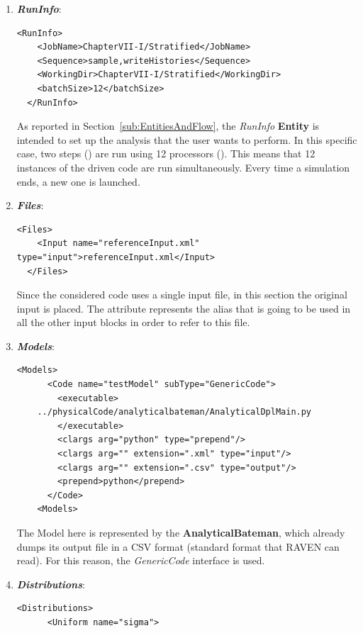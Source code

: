 \begin{enumerate}
   \item \textbf{\textit{RunInfo}}:
\begin{lstlisting}[style=XML,morekeywords={arg,extension,pauseAtEnd,overwrite}]
  <RunInfo>
    <JobName>ChapterVII-I/Stratified</JobName>
    <Sequence>sample,writeHistories</Sequence>
    <WorkingDir>ChapterVII-I/Stratified</WorkingDir>
    <batchSize>12</batchSize>
  </RunInfo>
\end{lstlisting}   
   As reported in Section~\ref{sub:EntitiesAndFlow}, the \textit{RunInfo} \textbf{Entity} is intended to set up the analysis 
   that the user wants to perform. In this specific case, two steps () are  run 
   using 12 processors (). This means that
   12 instances of the driven code are run simultaneously. 
   Every time a simulation ends, a new one is launched.
   \item \textbf{\textit{Files}}:
\begin{lstlisting}[style=XML,morekeywords={arg,extension,pauseAtEnd,overwrite}]
  <Files>
    <Input name="referenceInput.xml" type="input">referenceInput.xml</Input>
  </Files>
\end{lstlisting}
   Since the considered code uses a single input file, in this section the original input is placed. 
   The attribute   represents the alias that is going to be used in all the other input blocks in order to refer to this file.
   \item \textbf{\textit{Models}}:
\begin{lstlisting}[style=XML,morekeywords={arg,extension,pauseAtEnd,overwrite}]
   <Models>
      <Code name="testModel" subType="GenericCode">
        <executable>
    ../physicalCode/analyticalbateman/AnalyticalDplMain.py
        </executable>
        <clargs arg="python" type="prepend"/>
        <clargs arg="" extension=".xml" type="input"/>
        <clargs arg="" extension=".csv" type="output"/>
        <prepend>python</prepend>
      </Code>
    <Models>
\end{lstlisting}
 The Model here is represented by the 
 \textbf{AnalyticalBateman}, which already dumps its output file in a 
 CSV format (standard format that RAVEN can read). For this reason,
 the \textit{GenericCode} interface is used.
   \item \textbf{\textit{Distributions}}:
\begin{lstlisting}[style=XML,morekeywords={arg,extension,pauseAtEnd,overwrite}]
  <Distributions>
      <Uniform name="sigma">

\end{lstlisting}
\end{enumerate}
